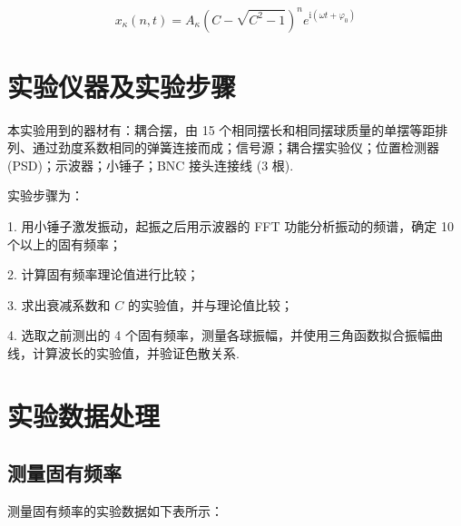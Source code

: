 \documentclass{customDoc}
\begin{document}
\begin{equation}
    x_\kappa(n, t) = A_\kappa(C-\sqrt{C^2-1})^ne^{\text{i}(\omega t + \varphi_0)}
\end{equation}

\section{实验仪器及实验步骤}

本实验用到的器材有：耦合摆，由 15 个相同摆长和相同摆球质量的单摆等距排列、通过劲度系数相同的弹簧连接而成；信号源；耦合摆实验仪；位置检测器 (PSD)；示波器；小锤子；BNC 接头连接线 (3 根).

实验步骤为：

1. 用小锤子激发振动，起振之后用示波器的 FFT 功能分析振动的频谱，确定 10 个以上的固有频率；

2. 计算固有频率理论值进行比较；

3. 求出衰减系数和 $C$ 的实验值，并与理论值比较；

4. 选取之前测出的 4 个固有频率，测量各球振幅，并使用三角函数拟合振幅曲线，计算波长的实验值，并验证色散关系.

\section{实验数据处理}

\subsection{测量固有频率}

测量固有频率的实验数据如下表所示：
\end{document}
